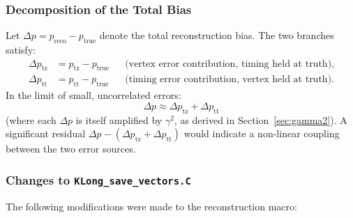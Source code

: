 \subsubsection{Decomposition of the Total Bias}

Let $\Delta p = p_{\text{reco}} - p_{\text{true}}$ denote the total reconstruction
bias.  The two branches satisfy:
\begin{align}
  \Delta p_{\text{tz}} &= p_{\text{tz}} - p_{\text{true}}
      &&\text{(vertex error contribution, timing held at truth)},\\
  \Delta p_{\text{tt}} &= p_{\text{tt}} - p_{\text{true}}
      &&\text{(timing error contribution, vertex held at truth)}.
\end{align}
In the limit of small, uncorrelated errors:
\begin{equation}
  \Delta p \approx \Delta p_{\text{tz}} + \Delta p_{\text{tt}}
  \label{eq:bias_decomp}
\end{equation}
(where each $\Delta p$ is itself amplified by $\gamma^2$, as derived in
Section~\ref{sec:gamma2}).  A significant residual $\Delta p - (\Delta p_{\text{tz}}
+ \Delta p_{\text{tt}})$ would indicate a non-linear coupling between the two error
sources.

\subsubsection{Changes to \texttt{KLong\_save\_vectors.C}}

The following modifications were made to the reconstruction macro:

